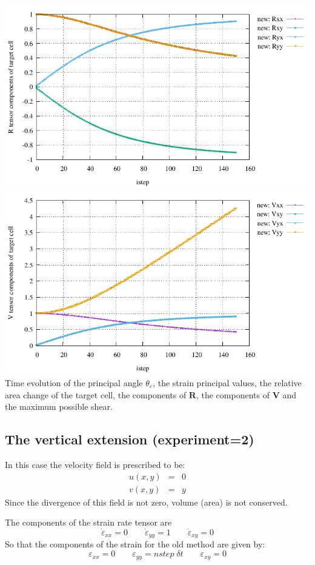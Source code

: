 \begin{center}
\includegraphics[width=9.cm]{python_codes/fieldstone_89/results/shearband/R.pdf}
\includegraphics[width=9.cm]{python_codes/fieldstone_89/results/shearband/V.pdf}\\
{\captionfont Time evolution of the principal angle $\theta_\varepsilon$, 
the strain principal values, the relative area change of the target cell, 
the components of ${\bm R}$, the components of ${\bm V}$ and the maximum 
possible shear.}
\end{center}










\newpage
\subsection*{The vertical extension (experiment=2)} 

In this case the velocity field is prescribed to be:
\begin{eqnarray}
u(x,y)&=&0 \\
v(x,y)&=&y
\end{eqnarray}
Since the divergence of this field is not zero, volume (area) is not conserved.

The components of the strain rate tensor are
\[
\dot\varepsilon_{xx} = 0 
\qquad
\dot\varepsilon_{yy} = 1
\qquad
\dot\varepsilon_{xy} = 0 
\]
So that the components of the strain for the old method are given by:
\[
\varepsilon_{xx} = 0 
\qquad
\varepsilon_{yy} = nstep \; \delta t
\qquad
\varepsilon_{xy} = 0 
\]



